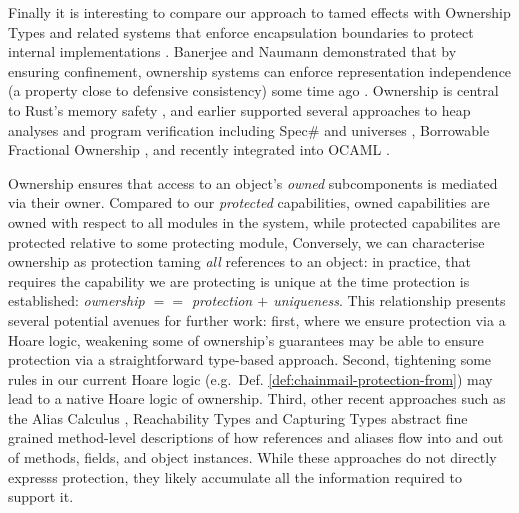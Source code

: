 
Finally it is interesting to compare our approach to tamed effects
with Ownership Types 
\cite{simpleOwnership,existOwn}
and related systems that 
enforce  encapsulation boundaries
to protect internal implementations
\cite{ownalias,NobPotVitECOOP98}.
Banerjee and Naumann demonstrated that by
ensuring confinement, ownership
systems can enforce representation independence (a property close to
defensive consistency) some time ago \cite{Banerjee:2005}.
%
Ownership is central to Rust's memory safety
\cite{RustPL2,RustBelt18}, and earlier supported several approaches
to heap analyses \cite{PotterNC98,HillNP02,MitECOOP06} and
program verification
\cite{BoyLisShrPOPL03,hypervisor} including Spec$\#$
\cite{BarLeiSch05,BarDelFahLeiSch04} and universes
\cite{DieDroMue07,DietlMueller05,LuPotPOPL06},
Borrowable Fractional Ownership \cite{borrow-fract-vmcai2024},
and recently integrated into OCAML \cite{ocaml-ownership-icfp2024,funk-ownership-oopsla2024}.





Ownership ensures that access to an object's \textit{owned} 
subcomponents is mediated via their owner.
Compared to our \textit{protected} capabilities,
owned capabilities are owned with respect to all
modules in the system, 
while protected capabilites are protected relative to some
protecting module,
Conversely, we can characterise ownership as
protection taming \textit{all} references to an object: in practice,
that requires the capability we are protecting is unique at the time
protection is established: \textit{ownership $==$ protection $+$
  uniqueness}.  This relationship presents several potential avenues
for further work: first, where we ensure protection via
a Hoare logic,
weakening some 
of ownership's guarantees may be able to ensure protection via a
straightforward type-based approach.
Second,  tightening some
rules in our current Hoare logic (e.g.\ Def. \ref{def:chainmail-protection-from})
may lead to a native  Hoare logic of ownership.
Third, other recent approaches such as 
%
%
the Alias
Calculus \cite{meyer-alias-calculus-scp2015,meyer-auto-alias-sncs2020},
Reachability
Types \cite{romf-reachability-types-oopsla2021,rompf-poly-reachability-oopsla2024}
and Capturing
Types \cite{odersky-capturing-types-toplas2023,scoped-effects-oopsla2022,odersky-reach-prog2024}
abstract fine grained method-level descriptions of how
references and aliases flow into and out of methods, fields,
and object instances. While these approaches do not directly
expresss protection, 
they likely accumulate all the information required to support it.


